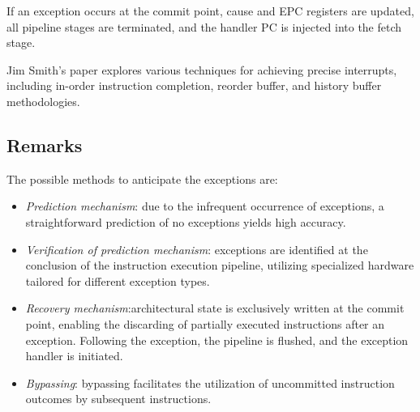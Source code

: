 If an exception occurs at the commit point, cause and EPC registers are updated, all pipeline stages are terminated, and the handler PC is injected into the fetch stage.

Jim Smith's paper explores various techniques for achieving precise interrupts, including in-order instruction completion, reorder buffer, and history buffer methodologies.

\subsection{Remarks}
The possible methods to anticipate the exceptions are: 
\begin{itemize}
    \item \textit{Prediction mechanism}: due to the infrequent occurrence of exceptions, a straightforward prediction of no exceptions yields high accuracy.
    \item \textit{Verification of prediction mechanism}: exceptions are identified at the conclusion of the instruction execution pipeline, utilizing specialized hardware tailored for different exception types.
    \item \textit{Recovery mechanism}:architectural state is exclusively written at the commit point, enabling the discarding of partially executed instructions after an exception.
        Following the exception, the pipeline is flushed, and the exception handler is initiated.
    \item \textit{Bypassing}: bypassing facilitates the utilization of uncommitted instruction outcomes by subsequent instructions.
\end{itemize}